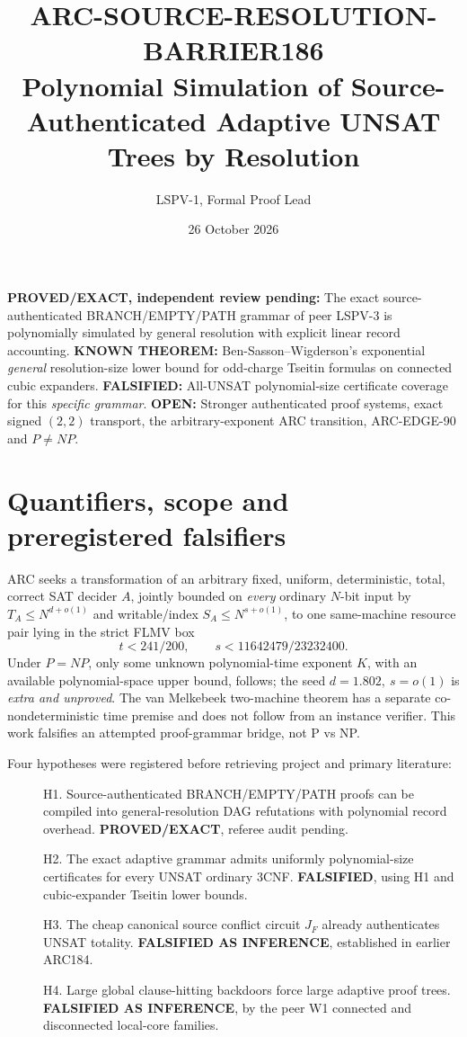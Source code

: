 \documentclass[11pt]{article}
\title{ARC-SOURCE-RESOLUTION-BARRIER186\\Polynomial Simulation of Source-Authenticated Adaptive UNSAT Trees by Resolution}
\author{LSPV-1, Formal Proof Lead}
\date{26 October 2026}
\begin{document}
\maketitle
\noindent\textbf{PROVED/EXACT, independent review pending:} The exact source-authenticated BRANCH/EMPTY/PATH grammar of peer LSPV-3 is polynomially simulated by general resolution with explicit linear record accounting.
\textbf{KNOWN THEOREM:} Ben-Sasson--Wigderson's exponential \emph{general} resolution-size lower bound for odd-charge Tseitin formulas on connected cubic expanders.
\textbf{FALSIFIED:} All-UNSAT polynomial-size certificate coverage for this \emph{specific grammar}.
\textbf{OPEN:} Stronger authenticated proof systems, exact signed $(2,2)$ transport, the arbitrary-exponent ARC transition, ARC-EDGE-90 and $P\ne NP$.

\section{Quantifiers, scope and preregistered falsifiers}
ARC seeks a transformation of an arbitrary fixed, uniform, deterministic, total, correct SAT decider \(A\), jointly bounded on \emph{every} ordinary \(N\)-bit input by \(T_A\le N^{d+o(1)}\) and writable/index \(S_A\le N^{s+o(1)}\), to one same-machine resource pair lying in the strict FLMV box
\[
t<241/200,\qquad s<11642479/23232400.
\]
Under \(P=NP\), only some unknown polynomial-time exponent \(K\), with an available polynomial-space upper bound, follows; the seed \(d=1.802,\ s=o(1)\) is \emph{extra and unproved}. The van Melkebeek two-machine theorem has a separate co-nondeterministic time premise and does not follow from an instance verifier. This work falsifies an attempted proof-grammar bridge, not P vs NP.

Four hypotheses were registered before retrieving project and primary literature:
\begin{description}
\item[] H1. Source-authenticated BRANCH/EMPTY/PATH proofs can be compiled into general-resolution DAG refutations with polynomial record overhead. \textbf{PROVED/EXACT}, referee audit pending.
\item[] H2. The exact adaptive grammar admits uniformly polynomial-size certificates for every UNSAT ordinary 3CNF. \textbf{FALSIFIED}, using H1 and cubic-expander Tseitin lower bounds.
\item[] H3. The cheap canonical source conflict circuit \(J_F\) already authenticates UNSAT totality. \textbf{FALSIFIED AS INFERENCE}, established in earlier ARC184.
\item[] H4. Large global clause-hitting backdoors force large adaptive proof trees. \textbf{FALSIFIED AS INFERENCE}, by the peer W1 connected and disconnected local-core families.
\end{description}
\end{document}
